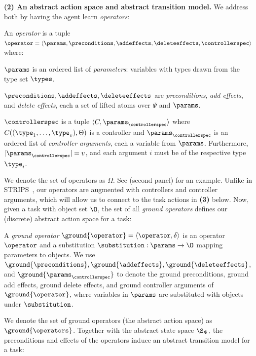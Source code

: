 \textbf{(2) An abstract action space and abstract transition model.} We address both by having the agent learn \emph{operators}:

\begin{defn}[Operator]
An \emph{operator} is a tuple $\operator = \langle \params, \preconditions, \addeffects, \deleteeffects, \controllerspec \rangle$ where:
\begin{tightlist}
\item $\params$ is an ordered list of \emph{parameters}: variables with types drawn from the type set $\types$.
\item $\preconditions, \addeffects, \deleteeffects$ are \emph{preconditions}, \emph{add effects}, and \emph{delete effects}, each a set of lifted atoms over $\Psi$ and $\params$. 
\item $\controllerspec$ is a tuple $\langle C, \params_{\controllerspec} \rangle$ where $C((\type_1, \dots, \type_v), \Theta)$ is a controller and $\params_{\controllerspec}$ is an ordered list of \emph{controller arguments}, each a variable from $\params$. Furthermore, $|\params_{\controllerspec}| = v$, and each argument $i$ must be of the respective type $\type_i$.
\end{tightlist}
\end{defn}

We denote the set of operators as $\Omega$.
See  (second panel) for an example. Unlike in STRIPS~\cite{fikes1971strips}, our operators are augmented with controllers and controller arguments, which will allow us to connect to the task actions in \textbf{(3)} below. Now, given a task with object set $\O$, the set of all \emph{ground operators} defines our (discrete) abstract action space for a task:

\begin{defn}
A \emph{ground operator} $\ground{\operator} = \langle \operator, \delta \rangle$ is an operator $\operator$ and a substitution $\substitution : \params \to \O$ mapping parameters to objects.
We use $\ground{\preconditions}, \ground{\addeffects}, \ground{\deleteeffects}$, and $\ground{\params_{\controllerspec}}$ to denote the ground preconditions, ground add effects, ground delete effects, and ground controller arguments of $\ground{\operator}$, where variables in $\params$ are substituted with objects under $\substitution$.
\end{defn}

We denote the set of ground operators (the abstract action space) as $\ground{\operators}$. Together with the abstract state space $\S_\Psi$, the preconditions and effects of the operators induce an abstract transition model for a task:

